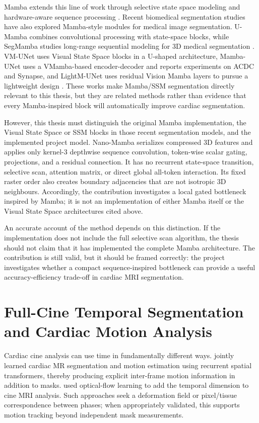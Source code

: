 Mamba extends this line of work through selective state space modeling and hardware-aware sequence processing \citep{gu2023mamba}. Recent biomedical segmentation studies have also explored Mamba-style modules for medical image segmentation. U-Mamba combines convolutional processing with state-space blocks, while SegMamba studies long-range sequential modeling for 3D medical segmentation \citep{ma2024umamba,xing2024segmamba}. VM-UNet uses Visual State Space blocks in a U-shaped architecture, Mamba-UNet uses a VMamba-based encoder-decoder and reports experiments on ACDC and Synapse, and LightM-UNet uses residual Vision Mamba layers to pursue a lightweight design \citep{ruan2024vmunet,wang2024mambaunet,liao2024lightmunet}. These works make Mamba/SSM segmentation directly relevant to this thesis, but they are related methods rather than evidence that every Mamba-inspired block will automatically improve cardiac segmentation.

However, this thesis must distinguish the original Mamba implementation, the Visual State Space or SSM blocks in those recent segmentation models, and the implemented project model. Nano-Mamba serializes compressed 3D features and applies only kernel-3 depthwise sequence convolution, token-wise scalar gating, projections, and a residual connection. It has no recurrent state-space transition, selective scan, attention matrix, or direct global all-token interaction. Its fixed raster order also creates boundary adjacencies that are not isotropic 3D neighbours. Accordingly, the contribution investigates a local gated bottleneck inspired by Mamba; it is not an implementation of either Mamba itself or the Visual State Space architectures cited above.

An accurate account of the method depends on this distinction. If the implementation does not include the full selective scan algorithm, the thesis should not claim that it has implemented the complete Mamba architecture. The contribution is still valid, but it should be framed correctly: the project investigates whether a compact sequence-inspired bottleneck can provide a useful accuracy-efficiency trade-off in cardiac MRI segmentation.

\section{Full-Cine Temporal Segmentation and Cardiac Motion Analysis}
Cardiac cine analysis can use time in fundamentally different ways. \citet{qin2018jointmotion} jointly learned cardiac MR segmentation and motion estimation using recurrent spatial transformers, thereby producing explicit inter-frame motion information in addition to masks. \citet{yan2019cineflow} used optical-flow learning to add the temporal dimension to cine MRI analysis. Such approaches seek a deformation field or pixel/tissue correspondence between phases; when appropriately validated, this supports motion tracking beyond independent mask measurements.

